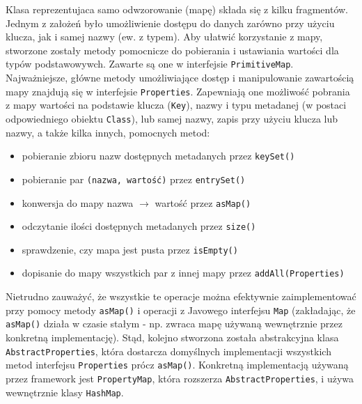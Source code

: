 Klasa reprezentujaca samo odwzorowanie (mapę) składa się z kilku fragmentów. Jednym z założeń było
umożliwienie dostępu do danych zarówno przy użyciu klucza, jak i samej nazwy (ew. z typem). Aby
ułatwić korzystanie z mapy, stworzone zostały metody pomocnicze do pobierania i ustawiania wartości
dla typów podstawowywch. Zawarte są one w interfejsie \texttt{PrimitiveMap}. Najważniejsze, główne
metody umożliwiające dostęp i manipulowanie zawartością mapy znajdują się w interfejsie
\texttt{Properties}. Zapewniają one możliwość pobrania z mapy wartości na podstawie klucza
(\texttt{Key}), nazwy i typu metadanej (w postaci odpowiedniego obiektu \texttt{Class}), lub samej
nazwy, zapis przy użyciu klucza lub nazwy, a także kilka innych, pomocnych metod:

\begin{itemize}
  \item pobieranie zbioru nazw dostępnych metadanych przez \texttt{keySet()}
  \item pobieranie par \texttt{(nazwa, wartość)} przez \texttt{entrySet()} 
  \item konwersja do mapy nazwa $\to$ wartość przez \texttt{asMap()}
  \item odczytanie ilości dostępnych metadanych przez \texttt{size()}
  \item sprawdzenie, czy mapa jest pusta przez \texttt{isEmpty()}
  \item dopisanie do mapy wszystkich par z innej mapy przez \texttt{addAll(Properties)}
\end{itemize}

Nietrudno zauważyć, że wszystkie te operacje można efektywnie zaimplementować przy pomocy metody
\texttt{asMap()} i operacji z Javowego interfejsu \texttt{Map} (zakładając, że \texttt{asMap()}
działa w czasie stałym - np. zwraca mapę używaną wewnętrznie przez konkretną implementację). Stąd,
kolejno stworzona została abstrakcyjna klasa \texttt{AbstractProperties}, która dostarcza domyślnych
implementacji wszystkich metod interfejsu \texttt{Properties} prócz \texttt{asMap()}. Konkretną
implementacją używaną przez framework jest \texttt{PropertyMap}, która rozszerza
\texttt{AbstractProperties}, i używa wewnętrznie klasy \texttt{HashMap}.



